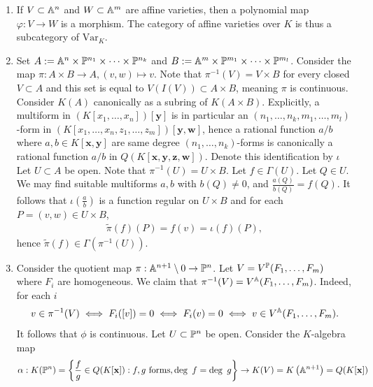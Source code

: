     \begin{example}
        \begin{enumerate}
            \item If $V\subset \mathbb{A}^n$ and $W\subset \mathbb{A}^m$ are affine varieties, then a polynomial map $\varphi: V\rightarrow W$ is a morphism. The category of affine varieties over $K$ is thus a subcategory of $\mathrm{Var}_K$. 
            \item Set $A:=\mathbb{A}^n\times \mathbb{P}^{n_1}\times \cdots \times \mathbb{P}^{n_k}$ and $B:= \mathbb{A}^m\times \mathbb{P}^{m_1}\times \cdots \times \mathbb{P}^{m_l}$. Consider the map $\pi : A\times B \rightarrow A, (v,w)\mapsto v$. Note that $\pi^{-1}(V)= V\times B$ for every closed $V\subset A$ and this set is equal to $V(I(V))\subset A\times B$, meaning $\pi$ is continuous. Consider $K(A)$ canonically as a subring of $K(A\times B)$.  Explicitly, a multiform in $(K[x_1,\dots,x_n])[\mathbf{y}]$ is in particular an $(n_1,\dots,n_k,m_1,\dots,m_l)$-form in $(K[x_1,\dots,x_n,z_1,\dots,z_m])[\mathbf{y},\mathbf{w}]$, hence a rational function $a/b$ where $a,b\in K[\mathbf{x},\mathbf{y}]$ are same degree $(n_1,\dots,n_k)$-forms is canonically a rational function $a/b$ in $Q(K[\mathbf{x},\mathbf{y},\mathbf{z},\mathbf{w}])$. Denote this identification by $\iota$ Let $U\subset A$ be open. Note that $\pi^{-1}(U)=U\times B$.
            Let $f\in \Gamma(U)$. Let $Q\in U$. We may find suitable multiforms $a,b$ with $b(Q)\neq 0$, and $\frac{a(Q)}{b(Q)}=f(Q)$. It follows that $\iota(\frac{a}{b})$ is a function regular on $ U\times B$ and for each $P=(v,w)\in U\times B$, 
            \begin{align*}
                \widetilde{\pi}(f)(P)=f(v)= \iota(f)(P), 
            \end{align*} 
            hence $\widetilde{\pi}(f)\in \Gamma(\pi^{-1}(U))$.
            \item Consider the quotient map $\pi : \mathbb{A}^{n+1}\setminus 0 \rightarrow \mathbb{P}^n$. Let $V= V^{\mathbb{P}}(F_1,\dots,F_m)$ where $F_i$ are homogeneous. We claim that $\pi^{-1}(V)=V^{\mathbb{A}}(F_1,\dots,F_m)$. Indeed, for each $i$
            \begin{align*}
                v\in \pi^{-1}(V) \iff F_i([v])=0 \iff F_i(v)=0 \iff v\in V^{\mathbb{A}}(F_1,\dots,F_m).
            \end{align*}
            It follows that $\phi$ is continuous. Let $U\subset \mathbb{P}^n$ be open. Consider the $K$-algebra map 
            \begin{gather*}
                \alpha : K(\Pp^n)=\left\{\frac{f}{g}\in Q(K[\mathbf{x}]): f,g \text{ forms}, \deg\ f = \deg \ g \right\} \rightarrow K(V)=K\left(\A^{n+1}\right) = Q(K[\mathbf{x}])\\

\end{gather*}
\end{enumerate}
\end{example}
